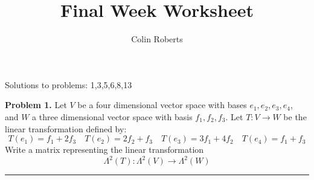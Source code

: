 \documentclass[leqno]{article}
\author{Colin Roberts}
\title{Final Week Worksheet}
\theoremstyle{nonumberplain}
\begin{document}
\maketitle
\begin{large}
\begin{center}
Solutions to problems: 1,3,5,6,8,13
\end{center}
\end{large}
\pagebreak

\noindent\textbf{Problem 1.} Let $V$ be a four dimensional vector space with bases $e_1,e_2,e_3,e_4$, and $W$ a three dimensional vector space with basis $f_1,f_2,f_3$. Let $T : V \longrightarrow W$ be the linear transformation defined by:
\[
T(e_1)=f_1+2f_3 \textrm{~~~} T(e_2)=2f_2+f_3 \textrm{~~~} T(e_3)=3f_1+4f_2 \textrm{~~~} T(e_4)=f_1+f_3
\]
Write a matrix representing the linear transformation
\[
\Lambda^2(T): \Lambda^2(V) \rightarrow \Lambda^2(W)
\]

\noindent\rule[0.5ex]{\linewidth}{1pt}
\end{document}
